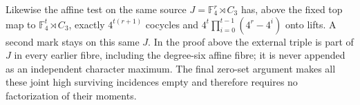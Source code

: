 Likewise the affine test on the same source
$J=\mathbb F_4^r\rtimes C_3$ has, above the fixed top map to
$\mathbb F_4^t\rtimes C_3$, exactly
$4^{t(r+1)}$ cocycles and
$4^t\prod_{i=0}^{t-1}(4^r-4^i)$ onto lifts. A second mark stays
on this same $J$. In the proof above the external triple is part of
$J$ in every earlier fibre, including the degree-six affine fibre;
it is never appended as an independent character maximum. The final
zero-set argument makes all these joint high surviving incidences
empty and therefore requires no factorization of their moments.
